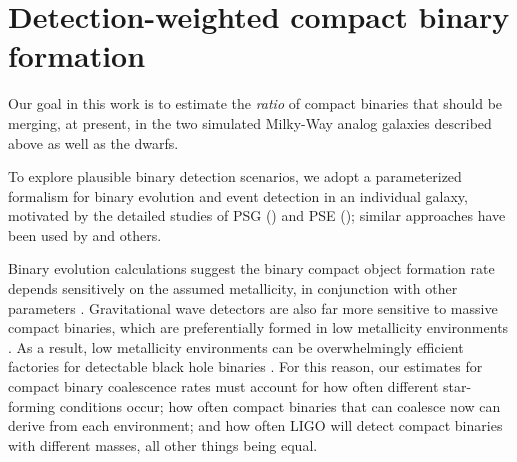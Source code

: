 \documentclass[nofootinbib,twocolumn,prd]{emulateapj}
\newcommand\abbrvPSgrb{PSG}
\newcommand\abbrvPSellipticals{PSE}
\begin{document}
\section{Detection-weighted compact binary formation}
\label{sec:model}

Our goal in this work is to estimate the \emph{ratio} of compact binaries that should be merging, at present, in the two
simulated Milky-Way analog galaxies described above as well as the dwarfs.

To explore plausible binary detection scenarios, we adopt a parameterized formalism for binary evolution and event
detection in an individual galaxy, motivated by
the detailed studies of  \abbrvPSgrb{} (\cite{PSgrbs-popsyn}) and \abbrvPSellipticals{} (\cite{PSellipticals});  similar approaches have been used by
\cite{2016arXiv160508783L} and others.


Binary evolution calculations suggest the binary compact object formation rate depends sensitively on the assumed metallicity, in conjunction
with other parameters \citep[see,\,e.g.][and references
  therein]{popsyn-LowMetallicityImpact-Chris2008,popsyn-LIGO-SFR-2008,gwastro-EventPopsynPaper-2016}.
Gravitational wave detectors are also far more sensitive to  massive compact binaries, which are  preferentially  formed in low metallicity
environments \citep{PSellipticals,popsyn-LowMetallicityImpact2c-StarTrackRevised-2014}.  As a result, low metallicity
environments can be overwhelmingly efficient factories for detectable black hole binaries
\citep{popsyn-LowMetallicityImpact2c-StarTrackRevised-2014,gwastro-EventPopsynPaper-2016}.  
%
For this reason, our estimates for compact binary coalescence rates must account for how often  different star-forming
conditions occur;  how often compact binaries that can coalesce now can derive from each environment; and how often LIGO will detect compact
binaries with different masses, all other things being equal.
\end{document}
